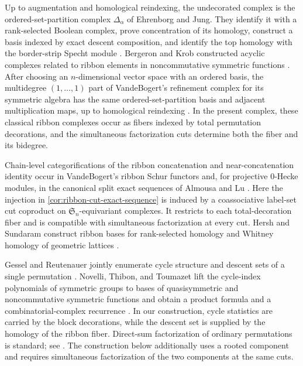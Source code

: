 \documentclass{amsart}
\theoremstyle{definition}
\theoremstyle{remark}
\begin{document}
Up to augmentation and homological reindexing, the undecorated complex is the
ordered-set-partition complex $\Delta_\alpha$ of Ehrenborg and Jung.  They
identify it with a rank-selected Boolean complex, prove concentration of its
homology, construct a basis indexed by exact descent composition, and identify
the top homology with the border-strip Specht module
\cite[Theorem~4.2, Theorem~6.6, and Proposition~7.3]{EhrenborgJung2013}.
Bergeron and Krob constructed acyclic complexes related to ribbon elements in
noncommutative symmetric functions \cite{BergeronKrob1997}.  After choosing an
$n$-dimensional vector space with an ordered basis, the multidegree
$(1,\ldots,1)$ part of VandeBogert's refinement complex for its symmetric
algebra has the same ordered-set-partition basis and adjacent multiplication
maps, up to homological reindexing
\cite[Definition~A.7 and Example~A.8]{KellerVandeBogert2025}.  In the present
complex, these classical ribbon complexes occur as fibers indexed by total
permutation decorations, and the simultaneous factorization cuts determine
both the fiber and its bidegree.

Chain-level categorifications of the ribbon concatenation and
near-concatenation identity occur in VandeBogert's ribbon Schur functors and,
for projective $0$-Hecke modules, in the canonical split exact sequences of
Almousa and Lu \cite{KellerVandeBogert2025,AlmousaLu2026}.  Here the injection
in \cref{cor:ribbon-cut-exact-sequence} is induced by a coassociative label-set
cut coproduct on $\mathfrak S_n$-equivariant complexes.  It restricts to each
total-decoration fiber and is compatible with simultaneous factorization at
every cut.  Hersh and Sundaram construct ribbon bases for
rank-selected homology and Whitney homology of geometric lattices
\cite[Theorems~5.29--5.30]{HershSundaram2026}.

Gessel and Reutenauer jointly enumerate cycle structure and descent sets of a
single permutation \cite{GesselReutenauer1993}.  Novelli, Thibon, and Toumazet
lift the cycle-index polynomials of symmetric groups to bases of
quasisymmetric and noncommutative symmetric functions and obtain a product
formula and a combinatorial-complex recurrence
\cite{NovelliThibonToumazet2020}.  In our construction, cycle statistics are
carried by the block decorations, while the descent set is supplied by the
homology of the ribbon fiber.  Direct-sum factorization of ordinary
permutations is standard; see
\cite[Equation~(34), Proposition~3.3, and the discussion before
Theorem~4.7]{HivertNovelliThibon2008}.  The construction below additionally uses a rooted component and requires
simultaneous factorization of the two components at the same cuts.
\end{document}
